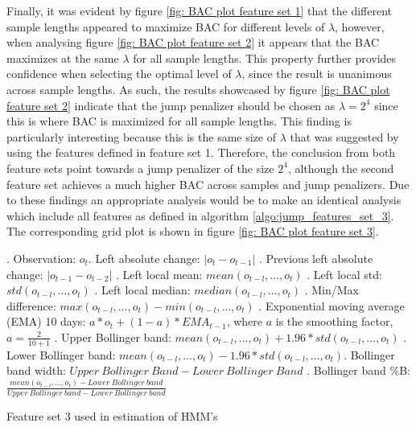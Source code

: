 Finally, it was evident by figure \ref{fig: BAC plot feature set 1} that the different sample lengths appeared to maximize BAC for different levels of $\lambda$, however, when analysing figure \ref{fig: BAC plot feature set 2} it appears that the BAC maximizes at the same $\lambda$ for all sample lengths. This property further provides confidence when selecting the optimal level of $\lambda$, since the result is unanimous across sample lengths. As such, the results showcased by figure \ref{fig: BAC plot feature set 2} indicate that the jump penalizer should be chosen as $\lambda = 2^4$ since this is where BAC is maximized for all sample lengths. This finding is particularly interesting because this is the same size of $\lambda$ that was suggested by using the features defined in feature set 1. Therefore, the conclusion from both feature sets point towards a jump penalizer of the size $2^4$, although the second feature set achieves a much higher BAC across samples and jump penalizers. Due to these findings an appropriate analysis would be to make an identical analysis which include all features as defined in algorithm \ref{algo:jump_features_set_3}. The corresponding grid plot is shown in figure \ref{fig: BAC plot feature set 3}.

\begin{algorithm}[H]
. Observation: $o_t$. Left absolute change: $|o_t-o_{t-1}|$ . Previous left absolute change: $|o_{t-1}-o_{t-2}|$ . Left local mean: $mean(o_{t-l},\ldots,o_{t})$ . Left local std: $std(o_{t-l},\ldots, o_{t})$ . Left local median: $median(o_{t-l},\ldots,o_{t})$ . Min/Max difference: $max(o_{t-l},\ldots,o_{t}) - min(o_{t-l},\ldots,o_{t})$ . Exponential moving average (EMA) 10 days: $a * o_t + (1-a) * EMA_{t-1}$, \quad where $a$ is the smoothing factor, $a = \frac{2}{10+1}$ . Upper Bollinger band: $mean(o_{t-l},\ldots,o_t) + 1.96 * std(o_{t-l},\ldots,o_t)$ . Lower Bollinger band: $mean(o_{t-l},\ldots,o_t) - 1.96 * std(o_{t-l},\ldots,o_t)$. Bollinger band width: $Upper\ Bollinger\ Band - Lower\  Bollinger\ Band$ . Bollinger band \%B: $\frac{mean(o_{t-l},\ldots,o_{t}) - Lower\ Bollinger\ band} {Upper\ Bollinger\ band - Lower\ Bollinger\ band}$  \;
\BlankLine
{}
\caption{Feature set 3 used in \jump estimation of HMM's}
\label{algo:jump_features_set_3}
\end{algorithm}


